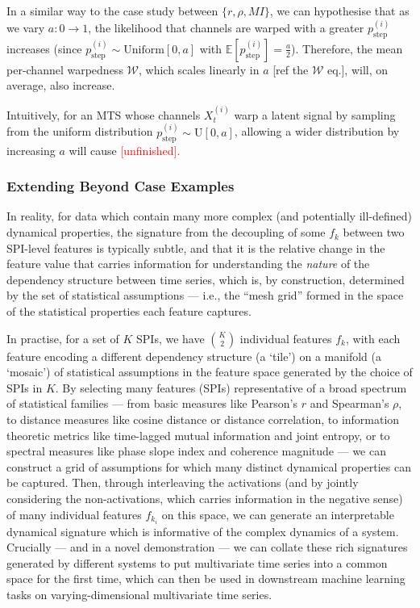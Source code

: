 \documentclass{article}
\theoremstyle{plain}
\theoremstyle{definition}
\theoremstyle{remark}
\begin{document}
In a similar way to the case study between $\{r, \rho, MI\}$, we can hypothesise that as we vary $a: 0 \to 1$, the likelihood that channels are warped with a greater $p_{\mathrm{step}}^{(i)}$ increases (since $p_{\mathrm{step}}^{(i)} \sim \mathrm{Uniform}[0,a]$ with $\mathbb{E}[p_{\mathrm{step}}^{(i)}] = \frac{a}{2}$). Therefore, the mean per-channel warpedness $\mathcal{W}$, which scales linearly in $a$ [ref the $\mathcal{W}$ eq.], will, on average, also increase.

Intuitively, for an MTS whose channels $X_t^{(i)}$ warp a latent signal by sampling from the uniform distribution $p_{\mathrm{step}}^{(i)} \sim \mathrm{U}[0,a]$, allowing a wider distribution by increasing $a$ will cause \textcolor{red}{[unfinished].}

\subsubsection{Extending Beyond Case Examples}

In reality, for data which contain many more complex (and potentially ill-defined) dynamical properties, the signature from the decoupling of some $f_k$ between two SPI-level features is typically subtle, and that it is the relative change in the feature value that carries information for understanding the \textit{nature} of the dependency structure between time series, which is, by construction, determined by the set of statistical assumptions — i.e., the “mesh grid” formed in the space of the statistical properties each feature captures. 

In practise, for a set of $K$ SPIs, we have ${K \choose 2}$ individual features $f_k$, with each feature encoding a different dependency structure (a ‘tile’) on a manifold (a ‘mosaic’) of statistical assumptions in the feature space generated by the choice of SPIs in $K$. By selecting many features (SPIs) representative of a broad spectrum of statistical families — from basic measures like Pearson’s $r$ and Spearman’s $\rho$, to distance measures like cosine distance or distance correlation, to information theoretic metrics like time-lagged mutual information and joint entropy, or to spectral measures like phase slope index and coherence magnitude — we can construct a grid of assumptions for which many distinct dynamical properties can be captured. Then, through interleaving the activations (and by jointly considering the non-activations, which carries information in the negative sense) of many individual features $f_{k_i}$ on this space, we can generate an interpretable dynamical signature which is informative of the complex dynamics of a system. Crucially — and in a novel demonstration — we can collate these rich signatures generated by different systems to put multivariate time series into a common space for the first time, which can then be used in downstream machine learning tasks on varying-dimensional multivariate time series.
\end{document}
